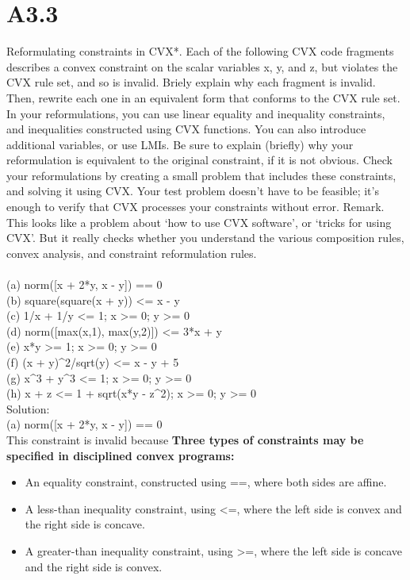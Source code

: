 \documentclass{article}
\begin{document}
\section*{A3.3}
Reformulating constraints in CVX*. Each of the following CVX code fragments describes a convex
constraint on the scalar variables x, y, and z, but violates the CVX rule set, and so is invalid. Briely explain why each fragment is invalid. Then, rewrite each one in an equivalent form that conforms to the CVX rule set. In your reformulations, you can use linear equality and inequality constraints, and inequalities constructed using CVX functions. You can also introduce additional variables, or use LMIs. Be sure to explain (briefly) why your reformulation is equivalent to the original constraint, if it is not obvious.
Check your reformulations by creating a small problem that includes these constraints, and solving it using CVX. Your test problem doesn't have to be feasible; it's enough to verify that CVX processes your constraints without error.
Remark. This looks like a problem about `how to use CVX software', or `tricks for using CVX'.
But it really checks whether you understand the various composition rules, convex analysis, and
constraint reformulation rules.\\ \\
(a) norm([x + 2*y, x - y]) == 0 \\
(b) square(square(x + y)) \textless= x - y\\
(c) 1/x + 1/y <= 1; x \textgreater = 0; y \textgreater = 0\\
(d) norm([max(x,1), max(y,2)]) \textless= 3*x + y\\
(e) x*y \textgreater= 1; x \textgreater= 0; y \textgreater= 0\\
(f) (x + y)\^{}2/sqrt(y) \textless= x - y + 5\\
(g) x\^{}3 + y\^{}3 <= 1; x \textgreater= 0; y \textgreater= 0\\
(h) x + z <= 1 + sqrt(x*y - z\^{}2); x \textgreater= 0; y \textgreater= 0\\

Solution: \\

(a)  norm([x + 2*y, x - y]) == 0 \\

This constraint is invalid because {\bf Three types of constraints may be specified in disciplined convex programs:\\
}

\begin{itemize}
	\item An equality constraint, constructed using ==, where both sides are affine.
	\item A less-than inequality constraint, using <=, where the left side is convex and the right side is concave.
	\item A greater-than inequality constraint, using >=, where the left side is concave and the right side is convex.
\end{itemize}
\end{document}
